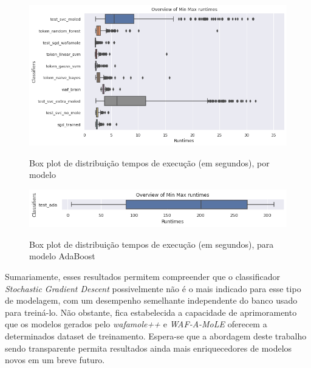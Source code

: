 \begin{figure}[ht]
    \centering
    \caption{Box plot de distribuição tempos de execução (em segundos), por modelo}
    \includegraphics[width=18cm]{figuras/graficos/min_max_all.png} 
    \label{fig:min-max-all} 
\end{figure}

\begin{figure}[ht]
    \centering
    \caption{Box plot de distribuição tempos de execução (em segundos), para modelo AdaBoost}
    \includegraphics[width=18cm]{figuras/graficos/min_max_ada.png} 
    \label{fig:min-max-ada} 
\end{figure}

Sumariamente, esses resultados permitem compreender que o classificador \textit{Stochastic Gradient Descent} possivelmente não é o mais indicado para esse tipo de modelagem, com um desempenho semelhante independente do banco usado para treiná-lo. Não obstante, fica estabelecida a capacidade de aprimoramento que os modelos gerados pelo \textit{wafamole++} e \textit{WAF-A-MoLE} oferecem a determinados dataset de treinamento. Espera-se que a abordagem deste trabalho sendo transparente permita resultados ainda mais enriquecedores de modelos novos em um breve futuro.

